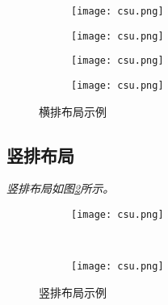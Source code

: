 \begin{figure}[!htb]
    \centering
    \begin{subfigure}[t]{0.24\linewidth}
        \caption{}
        \begin{minipage}[b]{1\linewidth}
        \texttt{[image: csu.png]}
        \end{minipage}
    \end{subfigure}
    \begin{subfigure}[t]{0.24\linewidth}
        \caption{}
        \begin{minipage}[b]{1\linewidth}
        \texttt{[image: csu.png]}
        \end{minipage}
    \end{subfigure}
    \begin{subfigure}[t]{0.24\linewidth}
        \caption{}
        \begin{minipage}[b]{1\linewidth}
        \texttt{[image: csu.png]}
        \end{minipage}
    \end{subfigure}
    \begin{subfigure}[t]{0.24\linewidth}
        \caption{}
        \begin{minipage}[b]{1\linewidth}
        \texttt{[image: csu.png]}
        \end{minipage}
    \end{subfigure}
    \caption{横排布局示例}
    \label{F.csu_row}
\end{figure}

\lipsum

\subsection{竖排布局}
\emph{竖排布局如图\ref{F.csu_col}所示。}

\begin{figure}[!htb]
    \centering
    \begin{subfigure}[t]{0.15\linewidth}
        \caption{}
        \begin{minipage}[b]{1\linewidth}
        \texttt{[image: csu.png]}
        \end{minipage}
    \end{subfigure}\\
    \begin{subfigure}[t]{0.15\linewidth}
        \caption{}
        \begin{minipage}[b]{1\linewidth}
        \texttt{[image: csu.png]}
        \end{minipage}
    \end{subfigure}
    \caption{竖排布局示例}
    \label{F.csu_col}
\end{figure}


